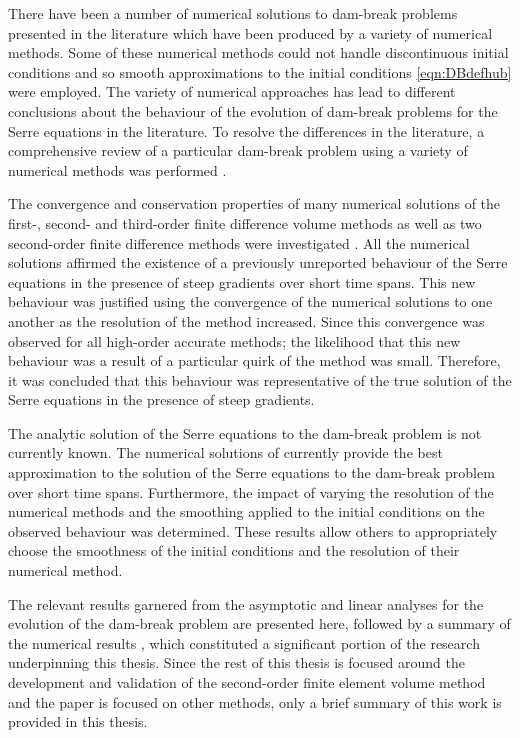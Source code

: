 There have been a number of numerical solutions to dam-break problems presented in the literature \cite{El-etal-2006,Hank-etal-2010-2034,Mitsotakis-etal-2014,Mitsotakis-etal-2017,doCarmo-etal-2018-404} which have been produced by a variety of numerical methods. Some of these numerical methods could not handle discontinuous initial conditions \cite{El-etal-2006,Mitsotakis-etal-2014,Mitsotakis-etal-2017,doCarmo-etal-2018-404} and so smooth approximations to the initial conditions \eqref{eqn:DBdefhub} were employed. The variety of numerical approaches has lead to different conclusions about the behaviour of the evolution of dam-break problems for the Serre equations in the literature. To resolve the differences in the literature, a comprehensive review of a particular dam-break problem using a variety of numerical methods was performed \cite{Pitt-2018-61}.

The convergence and conservation properties of many numerical solutions of the first-, second- and third-order finite difference volume methods as well as two second-order finite difference methods were investigated \cite{Pitt-2018-61}. All the numerical solutions affirmed the existence of a previously unreported behaviour of the Serre equations in the presence of steep gradients over short time spans. This new behaviour was justified using the convergence of the numerical solutions to one another as the resolution of the method increased. Since this convergence was observed for all high-order accurate methods; the likelihood that this new behaviour was a result of a particular quirk of the method was small. Therefore, it was concluded that this behaviour was representative of the true solution of the Serre equations in the presence of steep gradients.

The analytic solution of the Serre equations to the dam-break problem is not currently known. The numerical solutions of \citet{Pitt-2018-61} currently provide the best approximation to the solution of the Serre equations to the dam-break problem over short time spans. Furthermore, the impact of varying the resolution of the numerical methods and the smoothing applied to the initial conditions on the observed behaviour was determined. These results allow others to appropriately choose the smoothness of the initial conditions and the resolution of their numerical method.

The relevant results garnered from the asymptotic \cite{El-etal-2006} and linear \cite{Dougalis-etal-2007} analyses for the evolution of the dam-break problem are presented here, followed by a summary of the numerical results \cite{Pitt-2018-61}, which constituted a significant portion of the research underpinning this thesis. Since the rest of this thesis is focused around the development and validation of the second-order finite element volume method and the paper \cite{Pitt-2018-61} is focused on other methods, only a brief summary of this work is provided in this thesis.

